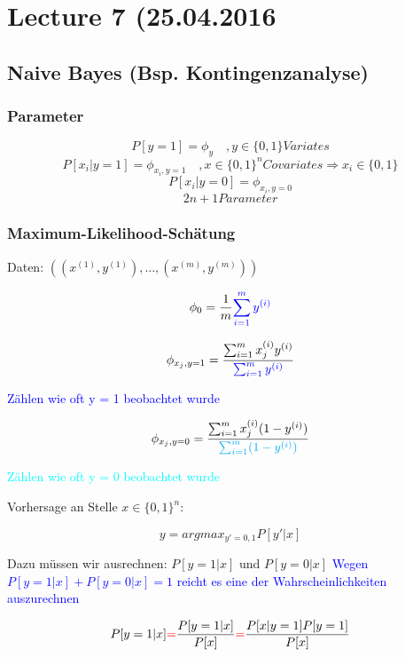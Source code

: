 \newcommand{\xj}[1]{\phi_{x_j, y=#1}}

\section*{Lecture 7 (25.04.2016}
\subsection*{Naive Bayes (Bsp. Kontingenzanalyse)}
	\subsubsection*{Parameter}
		\[ P[y=1] = \phi_y \quad, y \in \{0,1\} Variates\]
		\[ P[x_i|y=1] = \phi_{x_i, y = 1} \quad, x \in \{0,1\}^n Covariates  \Rightarrow x_i \in \{0,1\}\]
		\[ P[x_i|y=0] = \phi_{x_i, y = 0}\]
		\[2n + 1 Parameter \]
	
	\subsubsection*{Maximum-Likelihood-Schätung}
	
		Daten: $ ((x^{(1)},y^{(1)}),\dots,(x^{(m)},y^{(m)}) ) $
		
		\[ \phi_0 = \frac{1}{m} \textcolor{blue}{\sum_{i = 1}^{m} y^{(i)}}\]
		
		\[ \xj{1} = \frac{\sum_{i=1}^{m} x_j ^{(i)} y^{(i)}}{\textcolor{blue}{\sum_{i=1}^{m}y^{(i)}}} \]
			
			\textcolor{blue}{Zählen wie oft y = 1 beobachtet wurde}
			
		\[ \xj{0} =  \frac{\sum_{i=1}^{m} x_j ^{(i)} (1- y^{(i)})}{\textcolor{cyan}{\sum_{i=1}^{m}(1- y^{(i)})}} \]
		
			\textcolor{cyan}{Zählen wie oft y = 0 beobachtet wurde}
			
		Vorhersage an Stelle $ x \in \{0,1\}^n $:
		
		\begin{framed}
			\[ y = argmax_{y' = 0,1} P[y'|x] \]
		\end{framed}
		
		Dazu müssen wir ausrechnen: $ P[y = 1|x] $ und $ P[y = 0|x] $
		\textcolor{blue}{Wegen $ P[y = 1|x] + P[y = 0|x] = 1$ reicht es eine der Wahrscheinlichkeiten auszurechnen} 
		
		\[ P[y = 1|x] \textcolor{red}{=} \frac{P[y = 1|x]}{P[x]} \textcolor{red}{=} \frac{P[x| y = 1]P[y = 1]}{P[x]} \]
		
